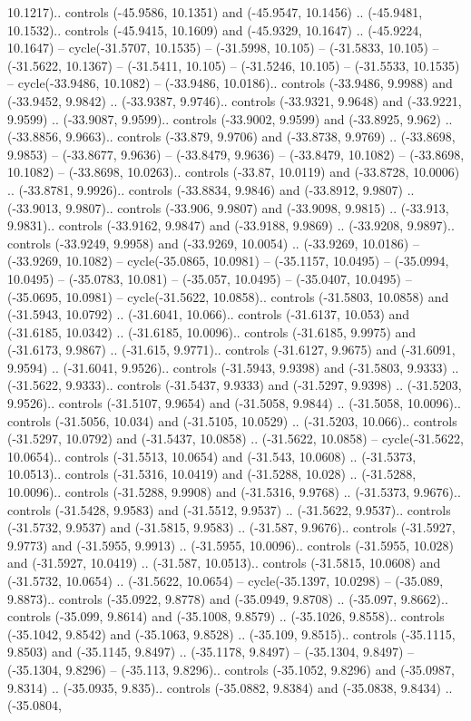 \begin{scope}[shift={(2.5552, 9.9912)}]
\begin{scope}[shift={(48.1654, -14.8546)}]
10.1217).. controls (-45.9586, 10.1351) and (-45.9547, 10.1456) .. (-45.9481, 10.1532).. controls (-45.9415, 10.1609) and (-45.9329, 10.1647) .. (-45.9224, 10.1647) -- cycle(-31.5707, 10.1535) -- (-31.5998, 10.105) -- (-31.5833, 10.105) -- (-31.5622, 10.1367) -- (-31.5411, 10.105) -- (-31.5246, 10.105) -- (-31.5533, 10.1535) -- cycle(-33.9486, 10.1082) -- (-33.9486, 10.0186).. controls (-33.9486, 9.9988) and (-33.9452, 9.9842) .. (-33.9387, 9.9746).. controls (-33.9321, 9.9648) and (-33.9221, 9.9599) .. (-33.9087, 9.9599).. controls (-33.9002, 9.9599) and (-33.8925, 9.962) .. (-33.8856, 9.9663).. controls (-33.879, 9.9706) and (-33.8738, 9.9769) .. (-33.8698, 9.9853) -- (-33.8677, 9.9636) -- (-33.8479, 9.9636) -- (-33.8479, 10.1082) -- (-33.8698, 10.1082) -- (-33.8698, 10.0263).. controls (-33.87, 10.0119) and (-33.8728, 10.0006) .. (-33.8781, 9.9926).. controls (-33.8834, 9.9846) and (-33.8912, 9.9807) .. (-33.9013, 9.9807).. controls (-33.906, 9.9807) and (-33.9098, 9.9815) .. (-33.913, 9.9831).. controls (-33.9162, 9.9847) and (-33.9188, 9.9869) .. (-33.9208, 9.9897).. controls (-33.9249, 9.9958) and (-33.9269, 10.0054) .. (-33.9269, 10.0186) -- (-33.9269, 10.1082) -- cycle(-35.0865, 10.0981) -- (-35.1157, 10.0495) -- (-35.0994, 10.0495) -- (-35.0783, 10.081) -- (-35.057, 10.0495) -- (-35.0407, 10.0495) -- (-35.0695, 10.0981) -- cycle(-31.5622, 10.0858).. controls (-31.5803, 10.0858) and (-31.5943, 10.0792) .. (-31.6041, 10.066).. controls (-31.6137, 10.053) and (-31.6185, 10.0342) .. (-31.6185, 10.0096).. controls (-31.6185, 9.9975) and (-31.6173, 9.9867) .. (-31.615, 9.9771).. controls (-31.6127, 9.9675) and (-31.6091, 9.9594) .. (-31.6041, 9.9526).. controls (-31.5943, 9.9398) and (-31.5803, 9.9333) .. (-31.5622, 9.9333).. controls (-31.5437, 9.9333) and (-31.5297, 9.9398) .. (-31.5203, 9.9526).. controls (-31.5107, 9.9654) and (-31.5058, 9.9844) .. (-31.5058, 10.0096).. controls (-31.5056, 10.034) and (-31.5105, 10.0529) .. (-31.5203, 10.066).. controls (-31.5297, 10.0792) and (-31.5437, 10.0858) .. (-31.5622, 10.0858) -- cycle(-31.5622, 10.0654).. controls (-31.5513, 10.0654) and (-31.543, 10.0608) .. (-31.5373, 10.0513).. controls (-31.5316, 10.0419) and (-31.5288, 10.028) .. (-31.5288, 10.0096).. controls (-31.5288, 9.9908) and (-31.5316, 9.9768) .. (-31.5373, 9.9676).. controls (-31.5428, 9.9583) and (-31.5512, 9.9537) .. (-31.5622, 9.9537).. controls (-31.5732, 9.9537) and (-31.5815, 9.9583) .. (-31.587, 9.9676).. controls (-31.5927, 9.9773) and (-31.5955, 9.9913) .. (-31.5955, 10.0096).. controls (-31.5955, 10.028) and (-31.5927, 10.0419) .. (-31.587, 10.0513).. controls (-31.5815, 10.0608) and (-31.5732, 10.0654) .. (-31.5622, 10.0654) -- cycle(-35.1397, 10.0298) -- (-35.089, 9.8873).. controls (-35.0922, 9.8778) and (-35.0949, 9.8708) .. (-35.097, 9.8662).. controls (-35.099, 9.8614) and (-35.1008, 9.8579) .. (-35.1026, 9.8558).. controls (-35.1042, 9.8542) and (-35.1063, 9.8528) .. (-35.109, 9.8515).. controls (-35.1115, 9.8503) and (-35.1145, 9.8497) .. (-35.1178, 9.8497) -- (-35.1304, 9.8497) -- (-35.1304, 9.8296) -- (-35.113, 9.8296).. controls (-35.1052, 9.8296) and (-35.0987, 9.8314) .. (-35.0935, 9.835).. controls (-35.0882, 9.8384) and (-35.0838, 9.8434) .. (-35.0804, 
\end{scope}
\end{scope}
